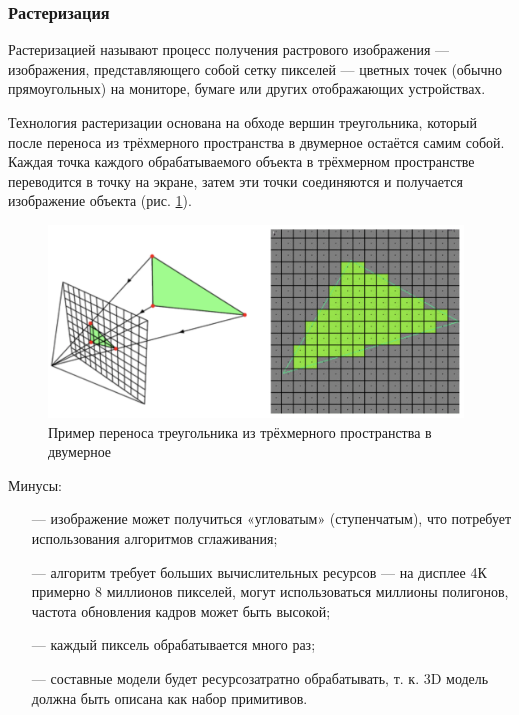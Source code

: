 \subsubsection{Растеризация}

Растеризацией \cite{rasterization} называют процесс получения растрового изображения --- 
изображения, представляющего собой сетку пикселей --- цветных точек 
(обычно прямоугольных) на мониторе, бумаге или других отображающих 
устройствах.

Технология растеризации основана на обходе вершин треугольника, 
который после переноса из трёхмерного пространства в двумерное остаётся 
самим собой.
Каждая точка каждого обрабатываемого объекта в трёхмерном 
пространстве переводится в точку на экране, затем эти точки соединяются и 
получается изображение объекта (рис. \ref{fig:rasterization}).

\begin{figure}[h]
	\centering
	\captionsetup{justification=centering}
	\includegraphics[width=110mm]{img/rasterization.png}
	\caption{Пример переноса треугольника из трёхмерного 
		пространства в двумерное}
	\label{fig:rasterization}
\end{figure}

Минусы:
\begin{itemize}[leftmargin=1.6\parindent]
	\item[---] изображение может получиться «угловатым» (ступенчатым), что 
	потребует использования алгоритмов сглаживания;
	\item[---] алгоритм требует больших вычислительных ресурсов --- на дисплее 4К 
	примерно 8 миллионов пикселей, могут использоваться миллионы полигонов, 
	частота обновления кадров может быть высокой;
	\item[---] каждый пиксель обрабатывается много раз;
	\item[---] составные модели будет ресурсозатратно обрабатывать, т. к. 3D модель должна быть описана как набор примитивов.
\end{itemize}

